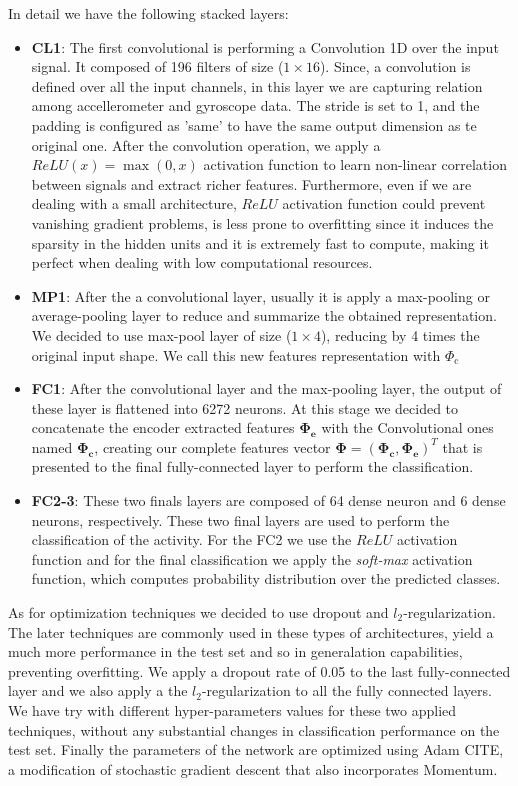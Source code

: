 In detail we have the following stacked layers:
\begin{itemize}
	\item \textbf{CL1}: The first convolutional is performing a Convolution 1D over the input signal. It composed of 196 filters of size ($1\times16$). Since, a convolution is defined over all the input channels, in this layer we are capturing relation among accellerometer and gyroscope data. The stride is set to 1, and the padding is configured as 'same' to have the same output dimension as te original one. After the convolution operation, we apply a $ReLU(x)=\max(0,x)$ activation function to learn non-linear correlation between signals and extract richer features. Furthermore, even if we are dealing with a small architecture, $ReLU$ activation function could prevent vanishing gradient problems, is less prone to overfitting since it induces the sparsity in the hidden units and it is extremely fast to compute, making it perfect when dealing with low computational resources.
	\item \textbf{MP1}: After the a convolutional layer, usually it is apply a max-pooling or average-pooling layer to reduce and summarize the obtained representation. We decided to use max-pool layer of size ($1\times4$), reducing by 4 times the original input shape. We call this new features representation with $ \Phi_{\text{c}} $
	\item \textbf{FC1}: After the convolutional layer and the max-pooling layer, the output of these layer is flattened into 6272 neurons. At this stage we decided to concatenate the encoder extracted features $ \boldsymbol{\Phi_{\text{e}}} $ with the Convolutional ones named $\boldsymbol{\Phi_{\text{c}}}$, creating our complete features vector $\boldsymbol{\Phi} = (\boldsymbol{\Phi_{\text{c}}}, \boldsymbol{\Phi_{\text{e}}})^T$ that is presented to the final fully-connected layer to perform the classification.
	\item \textbf{FC2-3}: These two finals layers are composed of 64 dense neuron and 6 dense neurons, respectively. These two final layers are used to perform the classification of the activity. For the FC2 we use the $ReLU$ activation function and for the final classification we apply the \textit{soft-max} activation function, which computes probability distribution over the predicted classes.
\end{itemize}

As for optimization techniques we decided to use dropout and $l_2$-regularization. The later techniques are commonly used in these types of architectures, yield a much more performance in the test set and so in generalation capabilities, preventing overfitting. We apply a dropout rate of 0.05 to the last fully-connected layer and we also apply a the $l_2$-regularization to all the fully connected layers. We have try with different hyper-parameters values for these two applied techniques, without any substantial changes in classification performance on the test set. Finally the parameters of the network are optimized using Adam CITE, a modification of stochastic gradient descent that also incorporates Momentum.
